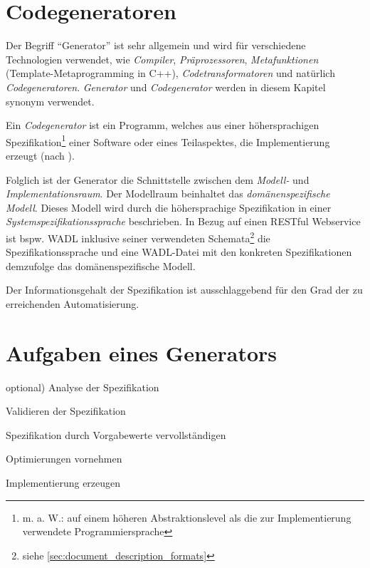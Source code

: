 \section{Codegeneratoren}


Der Begriff \enquote{Generator} ist sehr allgemein und wird für verschiedene Technologien verwendet, wie \emph{Compiler}, \emph{Präprozessoren}, \emph{Metafunktionen} (Template-Metaprogramming in C++), \emph{Codetransformatoren} und natürlich \emph{Codegeneratoren}. 
\emph{Generator} und \emph{Codegenerator} werden in diesem Kapitel synonym verwendet.

\begin{thesisDefinition}[Codegenerator]
Ein \emph{Codegenerator} ist ein Programm, welches aus einer höhersprachigen Spezifikation\footnote{m. a. W.: auf einem höheren Abstraktionslevel als die zur Implementierung verwendete Programmiersprache} einer Software oder eines Teilaspektes, die Implementierung erzeugt (nach \cite{czarnecki2000generative}).
\end{thesisDefinition}

Folglich ist der Generator die Schnittstelle zwischen dem \emph{Modell-} und \emph{Implementationsraum}. Der Modellraum beinhaltet das \emph{domänenspezifische Modell}. Dieses Modell wird durch die höhersprachige Spezifikation in einer \emph{Systemspezifikationssprache} beschrieben. In Bezug auf einen RESTful Webservice ist bspw. \gls{WADL} inklusive seiner verwendeten Schemata\footnote{siehe \cref{sec:document_description_formats}} die Spezifikationssprache und eine WADL-Datei mit den konkreten Spezifikationen demzufolge das domänenspezifische Modell.

Der Informationsgehalt der Spezifikation ist ausschlaggebend für den Grad der zu erreichenden Automatisierung.

\section{Aufgaben eines Generators}
\label{sec:generator_tasks}

\begin{compactenum}
    \item[optional)] Analyse der Spezifikation
    \item Validieren der Spezifikation
    \item Spezifikation durch Vorgabewerte vervollständigen
    \item Optimierungen vornehmen
    \item Implementierung erzeugen
\end{compactenum}


